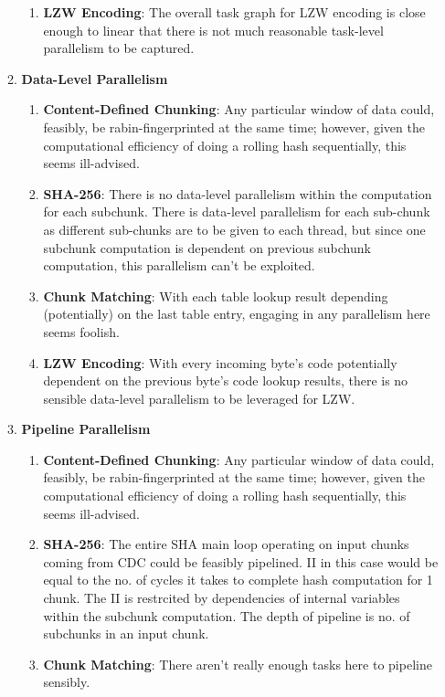 \documentclass{article}
\begin{document}
\begin{enumerate}
\begin{enumerate}[label=(\alph*)]
\begin{enumerate}[label=(\roman*)]
\item%
\textbf{LZW Encoding}:\newline
The overall task graph for LZW encoding is close enough to linear that there is not much reasonable task-level parallelism to be captured.

\end{enumerate}%

\item%
\textbf{Data-Level Parallelism}
\begin{enumerate}[label=(\roman*)]
\item%
\textbf{Content-Defined Chunking}:\newline
Any particular window of data could, feasibly, be rabin-fingerprinted at the same time; however, given the computational efficiency of doing a rolling hash sequentially, this seems ill-advised.
\item%
\textbf{SHA-256}:\newline
There is no data-level parallelism within the computation for each subchunk. There is data-level parallelism for each sub-chunk as different sub-chunks are to be given to each thread, but since 
one subchunk computation is dependent on previous subchunk computation, this parallelism can't be exploited.
\item%
\textbf{Chunk Matching}:\newline
With each table lookup result depending (potentially) on the last table entry, engaging in any parallelism here seems foolish.

\item%
\textbf{LZW Encoding}:\newline
With every incoming byte's code potentially dependent on the previous byte's code lookup results, there is no sensible data-level parallelism to be leveraged for LZW.

\end{enumerate}%

\item%
\textbf{Pipeline Parallelism}
\begin{enumerate}[label=(\roman*)]
\item%
\textbf{Content-Defined Chunking}:\newline
Any particular window of data could, feasibly, be rabin-fingerprinted at the same time; however, given the computational efficiency of doing a rolling hash sequentially, this seems ill-advised.
\item%
\textbf{SHA-256}:\newline
The entire SHA main loop operating on input chunks coming from CDC could be feasibly pipelined. II in this case would be equal to the no. of cycles it takes to complete hash computation for 1 chunk. The II is restrcited by dependencies of internal
variables within the subchunk computation. The depth of pipeline is no. of subchunks in an input chunk. 
\item%
\textbf{Chunk Matching}:\newline
There aren't really enough tasks here to pipeline sensibly.


\end{enumerate}
\end{enumerate}
\end{enumerate}
\end{document}
